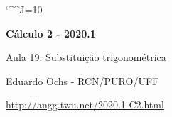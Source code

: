\documentclass[oneside,12pt]{article}
\begin{document}
\catcode`\^^J=10


\long{}
\long{}
\long{}
\long{}
\long{}
\long{}
\long{}
\long{}
\long{}
\long{}

\long{}
\long{}

\def\frown{\ensuremath{{=}{(}}}
\def\True {\mathbf{V}}
\def\False{\mathbf{F}}
\def\D    {\displaystyle}

\def\drafturl{http://angg.twu.net/LATEX/2020-1-C2.pdf}
\def\drafturl{http://angg.twu.net/2020.1-C2.html}
\def\draftfooter{\tiny \href{\drafturl}{\jobname{}} \ColorBrown{\shorttoday{} \hours}}



%

\thispagestyle{empty}

\begin{center}

\vspace*{1.2cm}

{\bf \Large Cálculo 2 - 2020.1}

\bsk

Aula 19: Substituição trigonométrica

\bsk

Eduardo Ochs - RCN/PURO/UFF

\url{http://angg.twu.net/2020.1-C2.html}

\end{center}

\newpage
\end{document}
